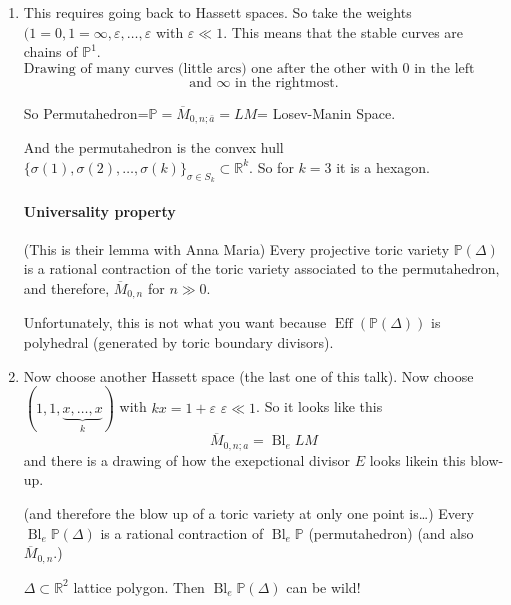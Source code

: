\begin{enumerate}[label=\textbf{Step \arabic*}]
	\item This requires going back to Hassett spaces. So take the weights $(1=0,1=\infty,\varepsilon,\ldots,\varepsilon$ with  $\varepsilon\ll1$. This means that the stable curves are chains of $\mathbb{P}^1$.
		\[\text{Drawing of many curves (little arcs) one after the other with 0 in the left most} \]
		\[\text{ and $\infty$ in the rightmost. } \]

		So Permutahedron=$\mathbb{P}=\overline{M}_{0,n;\bar{a}}=LM$= Losev-Manin Space.

		And the permutahedron is the convex hull $\{\sigma(1),\sigma(2),\ldots,\sigma(k)\}_{\sigma\in S_k} \subset \mathbb{R}^{k}$. So for $k=3$ it is a hexagon.

		 \paragraph{Universality property} (This is their lemma with Anna Maria) Every projective toric variety $\mathbb{P}(\Delta)$ is a rational contraction of the toric variety associated to the permutahedron, and therefore, $\overline{M}_{0,n}$ for $n\gg 0$.

		 Unfortunately, this is not what you want because $\operatorname{E f f}(\mathbb{P}(\Delta))$ is polyhedral (generated by toric boundary divisors).

		 \item Now choose another Hassett space (the last one of this talk). Now choose $(1,1, \underbrace{x,\ldots,x}_{k})$ with $kx=1+\varepsilon$ $\varepsilon \ll 1$. So it looks like this
			 \[\overline{M}_{0,n;a}=\operatorname{Bl}_eLM\]
			 and there is a drawing of how the exepctional divisor $E$ looks likein this blow-up.

			 \begin{thm}\leavevmode
			 	(and therefore the blow up of a toric variety at only one point is…) Every $\operatorname{Bl}_e\mathbb{P}(\Delta)$ is a rational contraction of $\operatorname{Bl}_{e}\mathbb{P}$ (permutahedron) 		(and also $\overline{M}_{0,n}$.)	 
			\end{thm}

			\begin{remark}
				$\Delta \subset \mathbb{R}^{2}$ lattice polygon. Then $\operatorname{Bl}_e\mathbb{P}(\Delta)$ can be wild!


\end{remark}
\end{enumerate}

